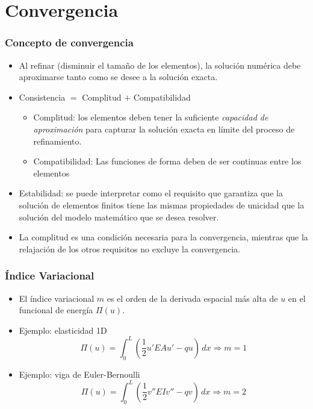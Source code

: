\documentclass{beamer}
\begin{document}
\section{Convergencia}
\begin{frame}
\frametitle{Concepto de convergencia}
\begin{itemize}
\item Al refinar (disminuir el tamaño de los elementos), la solución numérica 
debe aproximarse tanto como se desee a la solución exacta. \pause
\item Consistencia $=$ Complitud $+$ Compatibilidad
\begin{itemize}
\item Complitud: los elementos deben tener la suficiente {\em capacidad
de aproximación} para capturar la solución exacta en límite del proceso
de refinamiento.
\item Compatibilidad: Las funciones de forma deben de ser continuas entre
los elementos \pause
\end{itemize}
\item Estabilidad: se puede interpretar como el requisito que garantiza que la
solución de elementos finitos tiene las mismas propiedades de unicidad que la
solución del modelo matemático que se desea resolver. \pause
\item La complitud es una condición necesaria para la convergencia,
mientras que la relajación de los otros requisitos no excluye la convergencia.
\end{itemize}
\end{frame}
\begin{frame}
\frametitle{Índice Variacional}
\begin{itemize}
\item El índice variacional $m$ es el orden de la derivada espacial más alta de
$u$ en el funcional de energía $\Pi(u)$.
\item Ejemplo: elasticidad 1D
$$
\Pi(u)=\int_{0}^L \left(\frac{1}{2} u'EAu'-qu \right ) \, dx
\Rightarrow m=1
$$
\item Ejemplo: viga de Euler-Bernoulli
$$
\Pi(u)=\int_{0}^L \left(\frac{1}{2} v''EIv''-qv \right ) \, dx
\Rightarrow m=2
$$
\end{itemize}
\end{frame}
\end{document}
